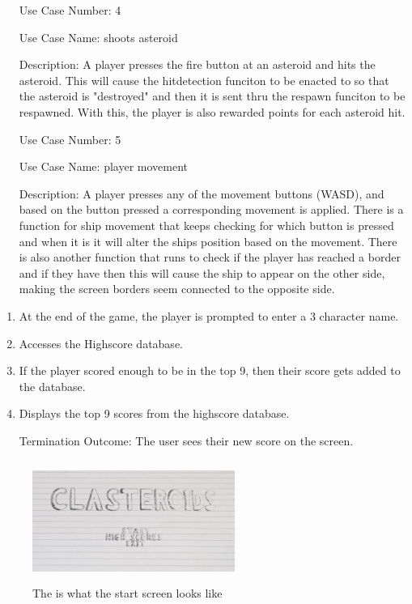 \documentclass[10pt,conference,onecolumn,compsoc]{IEEEtran}
\begin{document}
\begin{itemize}
\item[Use Case Number:] 4
\item[Use Case Name:] shoots asteroid
\item[Description:] A player presses the fire button at an asteroid and hits the asteroid. This will cause the hitdetection funciton to be enacted to so that the asteroid is "destroyed" and then it is sent thru the respawn funciton to be respawned. With this, the player is also rewarded points for each asteroid hit.
\end{itemize}

\begin{itemize}
\item[Use Case Number:] 5
\item[Use Case Name:] player movement
\item[Description:] A player presses any of the movement buttons (WASD), and based on the button pressed a corresponding movement is applied. There is a function for ship movement that keeps checking for which button is pressed and when it is it will alter the ships position based on the movement. There is also another function that runs to check if the player has reached a border and if they have then this will cause the ship to appear on the other side, making the screen borders seem connected to the opposite side. 
\end{itemize}

\begin{enumerate}
\item At the end of the game, the player is prompted to enter a 3 character name.
\item Accesses the Highscore database.
\item If the player scored enough to be in the top 9, then their score gets added to the database.
\item Displays the top 9 scores from the highscore database.
\item[Termination Outcome:] The user sees their new score on the screen.
\end{enumerate}


\begin{figure}[ht!]
\centering
\includegraphics[height=150px, width=250px]{Start.png}
\caption{The is what the start screen looks like}
\label{Start screen}
\end{figure}
\end{document}
